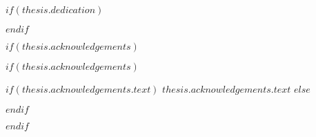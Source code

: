 \pagestyle{empty}


$if(thesis.dedication)$

\dedicatory{\vfill}{}

$endif$

$if(thesis.acknowledgements)$

%
%
 

$if(thesis.acknowledgements)$
\begingroup
\renewcommand{\abovechapterskip}{\vspace*{15pt}}  %
  \renewcommand{\chapterbelowskip}{\vspace*{20pt}}  %
  \renewcommand{\chapteralign}{\centering}      %
  \renewcommand{\chapterfont}{\bfseries\Large}  %

  \begin{acknowledgements}
  \thispagestyle{empty} 
  
  $if(thesis.acknowledgements.text)$
  $thesis.acknowledgements.text$
  $else$
  
  $endif$

  \end{acknowledgements}
\endgroup
$endif$

%
%
%
%
%
%
%
%
%

